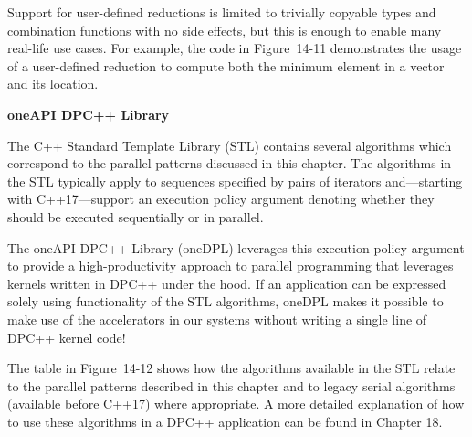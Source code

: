 Support for user-defined reductions is limited to trivially copyable types and combination functions with no side effects, but this is enough to enable many real-life use cases. For example, the code in Figure 14-11 demonstrates the usage of a user-defined reduction to compute both the minimum element in a vector and its location.\par

\hspace*{\fill} \par %
\textbf{oneAPI DPC++ Library}

The C++ Standard Template Library (STL) contains several algorithms which correspond to the parallel patterns discussed in this chapter. The algorithms in the STL typically apply to sequences specified by pairs of iterators and—starting with C++17—support an execution policy argument denoting whether they should be executed sequentially or in parallel.\par

The oneAPI DPC++ Library (oneDPL) leverages this execution policy argument to provide a high-productivity approach to parallel programming that leverages kernels written in DPC++ under the hood. If an application can be expressed solely using functionality of the STL algorithms, oneDPL makes it possible to make use of the accelerators in our systems without writing a single line of DPC++ kernel code!\par

The table in Figure 14-12 shows how the algorithms available in the STL relate to the parallel patterns described in this chapter and to legacy serial algorithms (available before C++17) where appropriate. A more detailed explanation of how to use these algorithms in a DPC++ application can be found in Chapter 18.\par

